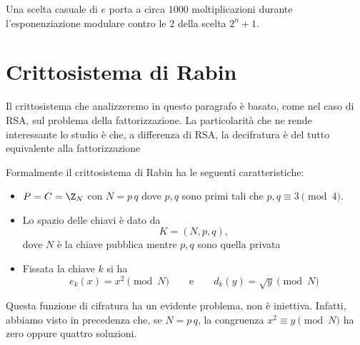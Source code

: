 	\begin{oss}
	Una scelta casuale di \(e\) porta a circa \(1000\) moltiplicazioni durante l'esponenziazione modulare contro le \(2\) della scelta \(2^n+1\).
	\end{oss}

\section{Crittosistema di Rabin}

	Il crittosistema che analizzeremo in questo paragrafo è basato, come nel caso di RSA, sul problema della fattorizzazione. La particolarità che ne rende interessante lo studio è che, a differenza di RSA, la decifratura è del tutto equivalente alla fattorizzazione

	Formalmente il crittosistema di Rabin ha le seguenti caratteristiche:
	\begin{itemize}
		\item \(P=C=\Z_N\) con \(N=p\,q\) dove \(p,q\) sono primi tali che \(p,q\equiv 3 \pmod{4}\).
		\item Lo spazio delle chiavi è dato da
			\[
			K = (N,p,q),
			\]
		dove \(N\) è la chiave pubblica mentre \(p,q\) sono quella privata
		\item Fissata la chiave \(k\) si ha
			\[
			e_k(x) = x^2 \pmod{N} \qquad\text{e}\qquad d_k(y) = \sqrt{y} \pmod{N}
			\]
	\end{itemize}

	Questa funzione di cifratura ha un evidente problema, non è iniettiva.
	Infatti, abbiamo visto in precedenza che, se \(N=p\,q\), la congruenza \(x^2 \equiv y \pmod{N}\) ha zero oppure quattro soluzioni.

